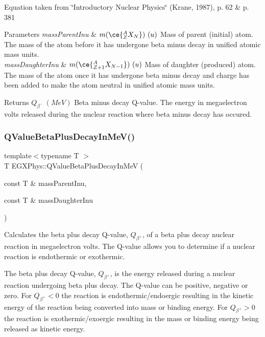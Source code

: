 Equation taken from \char`\"{}\+Introductory Nuclear Physics\char`\"{} (Krane, 1987), p. 62 \& p. 381


\begin{DoxyParams}{Parameters}
{\em mass\+Parent\+Inu} & $m(\ce{ ^{A}_{Z}X_{N} })\ (u)$ Mass of parent (initial) atom. The mass of the atom before it has undergone beta minus decay in unified atomic mass units. \\
\hline
{\em mass\+Daughter\+Inu} & $m(\ce{ ^{A}_{Z{+1}}X_{N-1} })\ (u)$ Mass of daughter (produced) atom. The mass of the atom once it has undergone beta minus decay and charge has been added to make the atom neutral in unified atomic mass units. \\
\hline
\end{DoxyParams}
\begin{DoxyReturn}{Returns}
$Q_{\beta^-}\ (MeV)$ Beta minus decay Q-\/value. The energy in megaelectron volts released during the nuclear reaction where beta minus decay has occured. 
\end{DoxyReturn}
\mbox{\label{group___q_value_ga9bf549cd4f8e1c76e9cc41b72d4f0279}} 
\subsubsection{\texorpdfstring{Q\+Value\+Beta\+Plus\+Decay\+In\+Me\+V()}{QValueBetaPlusDecayInMeV()}}
{\footnotesize\ttfamily template$<$typename T $>$ \\
T E\+G\+X\+Phys\+::\+Q\+Value\+Beta\+Plus\+Decay\+In\+MeV (\begin{DoxyParamCaption}\item[{const T \&}]{mass\+Parent\+Inu,  }\item[{const T \&}]{mass\+Daughter\+Inu }\end{DoxyParamCaption})}



Calculates the beta plus decay Q-\/value, $Q_{\beta^+}$, of a beta plus decay nuclear reaction in megaelectron volts. The Q-\/value allows you to determine if a nuclear reaction is endothermic or exothermic. 

The beta plus decay Q-\/value, $Q_{\beta^+}$, is the energy released during a nuclear reaction undergoing beta plus decay. The Q-\/value can be positive, negative or zero. For $Q_{\beta^+} < 0$ the reaction is endothermic/endoergic resulting in the kinetic energy of the reaction being converted into mass or binding energy. For $Q_{\beta^+} > 0$ the reaction is exothermic/exoergic resulting in the mass or binding energy being released as kinetic energy.


